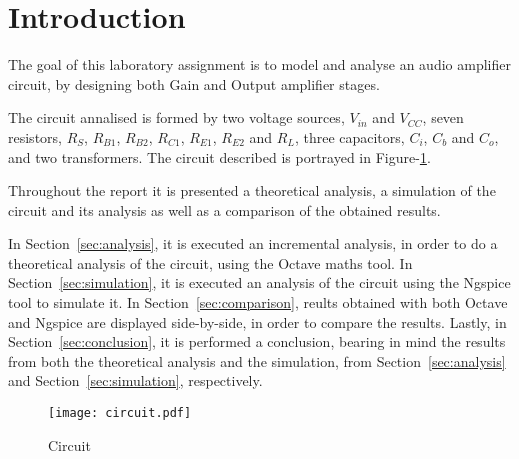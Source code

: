 \section{Introduction}
\label{sec:introduction}

The goal of this laboratory assignment is to model and analyse an audio amplifier
circuit, by designing both Gain and Output amplifier stages.\par

The circuit annalised is formed by two voltage sources, $V_{in}$ and $V_{CC}$,
seven resistors, $R_S$, $R_{B1}$, $R_{B2}$, $R_{C1}$, $R_{E1}$, $R_{E2}$ and $R_L$,
three capacitors, $C_i$, $C_b$ and $C_o$, and two transformers. The circuit described
is portrayed in Figure-\ref{fig:circuit}.\par

Throughout the report it is presented a theoretical analysis, a simulation of the
circuit and its analysis as well as a comparison of the obtained results. \par

In Section~\ref{sec:analysis}, it is executed an incremental analysis, in order to
do a theoretical analysis of the circuit, using the Octave maths tool.
In Section~\ref{sec:simulation}, it is executed an analysis of the circuit using
the Ngspice tool to simulate it.
In Section~\ref{sec:comparison}, reults obtained with both Octave and Ngspice are
displayed side-by-side, in order to compare the results.
Lastly, in Section~\ref{sec:conclusion}, it is performed a conclusion, bearing in mind the
results from both the theoretical analysis and the simulation, from Section~\ref{sec:analysis}
and Section~\ref{sec:simulation}, respectively.\par


\begin{figure}[h] \centering
\texttt{[image: circuit.pdf]}
\caption{Circuit}
\label{fig:circuit}
\end{figure}

\newpage

